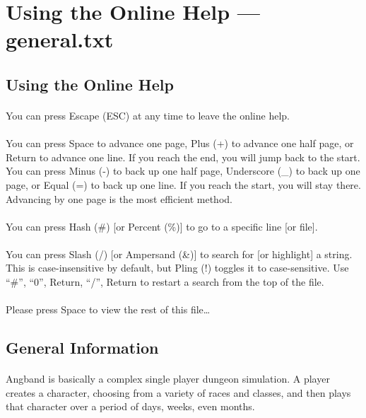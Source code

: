\section{Using the Online Help --- general.txt}
\subsection{Using the Online Help}
\paragraph{}You can press Escape (ESC) at any time to leave the online help.

\paragraph{}You can press Space to advance one page, Plus (+) to advance one half
page, or Return to advance one line. If you reach the end, you will
jump back to the start. You can press Minus (-) to back up one half
page, Underscore (\_) to back up one page, or Equal (=) to back up one
line. If you reach the start, you will stay there. Advancing by one
page is the most efficient method.

\paragraph{}You can press Hash (\#) [or Percent (\%)] to go to a specific line [or file].

\paragraph{}You can press Slash (/) [or Ampersand (\&)] to search for [or highlight]
a string. This is case-insensitive by default, but Pling (!) toggles it
to case-sensitive. Use ``\#'', ``0'', Return, ``/'', Return to restart a
search from the top of the file.

\paragraph{}Please press Space to view the rest of this file\ldots

\subsection{General Information}
\paragraph{}Angband is basically a complex single player dungeon simulation. A
player creates a character, choosing from a variety of races and
classes, and then plays that character over a period of days, weeks,
even months.

